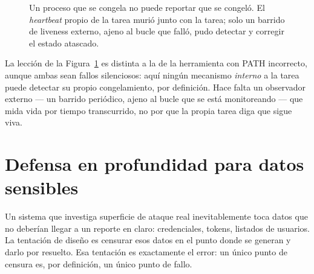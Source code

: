 \documentclass[10pt]{article}
\begin{document}
\begin{figure}[h]
\centering
{}
\caption{Un proceso que se congela no puede reportar que se congeló. El \textit{heartbeat} propio de la tarea murió junto con la tarea; solo un barrido de liveness externo, ajeno al bucle que falló, pudo detectar y corregir el estado atascado.}
\label{fig:liveness}
\end{figure}

La lección de la Figura~\ref{fig:liveness} es distinta a la de la herramienta con PATH incorrecto, aunque ambas sean fallos silenciosos: aquí ningún mecanismo \emph{interno} a la tarea puede detectar su propio congelamiento, por definición. Hace falta un observador externo --- un barrido periódico, ajeno al bucle que se está monitoreando --- que mida vida por tiempo transcurrido, no por que la propia tarea diga que sigue viva.

\section{Defensa en profundidad para datos sensibles}

Un sistema que investiga superficie de ataque real inevitablemente toca datos que no deberían llegar a un reporte en claro: credenciales, tokens, listados de usuarios. La tentación de diseño es censurar esos datos en el punto donde se generan y darlo por resuelto. Esa tentación es exactamente el error: un único punto de censura es, por definición, un único punto de fallo.
\end{document}
